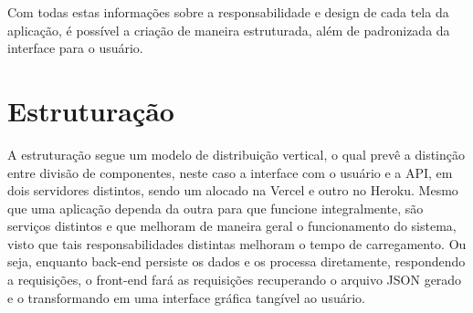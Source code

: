 Com todas estas informações sobre a responsabilidade e design de cada tela da aplicação, é possível a criação de maneira estruturada, além de padronizada da interface para o usuário. 

\section{Estruturação}
A estruturação segue um modelo de distribuição vertical, o qual prevê a distinção entre divisão de componentes, neste caso a interface com o usuário e a API, em dois servidores distintos, sendo um alocado na Vercel e outro no Heroku. Mesmo que uma aplicação dependa da outra para que funcione integralmente, são serviços distintos e que melhoram de maneira geral o funcionamento do sistema, visto que tais responsabilidades distintas melhoram o tempo de carregamento. Ou seja, enquanto back-end persiste os dados e os processa diretamente, respondendo a requisições, o front-end fará as requisições recuperando o arquivo JSON gerado e o transformando em uma interface gráfica tangível ao usuário.


